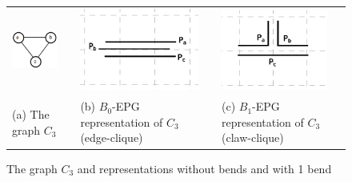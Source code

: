 
\begin{figure}[h]
  \centering
  \begin{tabular}{ p{3cm} p{0.7cm} p{4cm} p{0.7cm} p{4cm} }
    \includegraphics[width=2.3cm]{./img/trianguloabc} && \includegraphics[width=3.9cm]{./img/b0epgTransparenciaGrade2} & &
    \includegraphics[width=3.5cm]{./img/b1EpgTransparenteGrade2}
    \\
    \footnotesize
    (a) The  graph $C_3$ && \footnotesize(b) $B_0$-EPG representation of $C_3$ (edge-clique)&& \footnotesize(c) $B_1$-EPG representation of $C_3$ (claw-clique)\\
  \end{tabular}

 \caption{The  graph $ C_3 $  and  representations without bends and with 1 bend} \label{fig:trianguloepgRepresentacao}
\end{figure}
